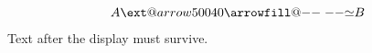 \documentclass{article}
\makeatletter
\newcommand*{\xtwoheadleftarrowish}[2][]{%
  \ext@arrow 500{40}{\arrowfill@{\relbar\relbar}\relbar\relbar}{#1}{#2}}
\makeatother
\begin{document}
\[
  A \xtwoheadleftarrowish{\simeq} B
\]
Text after the display must survive.
\end{document}
